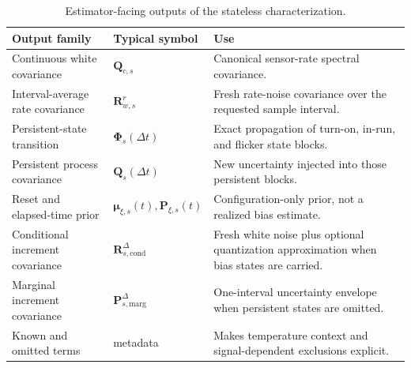 \documentclass[11pt,oneside,headings=big]{scrreprt}
\newcommand{\vect}[1]{\bm{#1}}
\newcommand{\mat}[1]{\bm{#1}}
\begin{document}
    \begin{table}[htbp]
        \centering
        \caption{Estimator-facing outputs of the stateless characterization.}
        \label{tab:characterization-outputs}
        \begin{tabularx}{\textwidth}{@{}L{1.95in}L{1.42in}Y@{}}
\toprule
\textbf{Output family} & \textbf{Typical symbol} & \textbf{Use} \\
\midrule
Continuous white covariance & $\mat Q_{c,s}$ & Canonical sensor-rate spectral covariance. \\
Interval-average rate covariance & $\mat R^r_{w,s}$ & Fresh rate-noise covariance over the requested sample interval. \\
Persistent-state transition & $\mat\Phi_s(\Delta t)$ & Exact propagation of turn-on, in-run, and flicker state blocks. \\
Persistent process covariance & $\mat Q_s(\Delta t)$ & New uncertainty injected into those persistent blocks. \\
Reset and elapsed-time prior & $\vect\mu_{\xi,s}(t),\mat P_{\xi,s}(t)$ & Configuration-only prior, not a realized bias estimate. \\
Conditional increment covariance & $\mat R^{\Delta}_{s,\mathrm{cond}}$ & Fresh white noise plus optional quantization approximation when bias states are carried. \\
Marginal increment covariance & $\mat P^{\Delta}_{s,\mathrm{marg}}$ & One-interval uncertainty envelope when persistent states are omitted. \\
Known and omitted terms & metadata & Makes temperature context and signal-dependent exclusions explicit. \\
\bottomrule
        \end{tabularx}
    \end{table}
\end{document}
